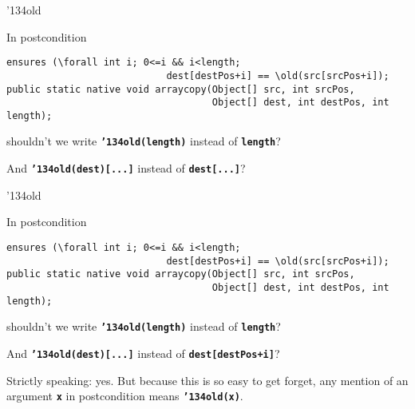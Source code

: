 \documentclass[
pdf,
nocolorBG,
slideColor,
cok,
]{prosper}
\newcommand{\code}[1]{{\rm \texttt{\textbf{\small #1}}}}
\newcommand{\bsl}{\char'134}
\newcommand{\old}{\bsl old}
\begin{document}

\begin{slide}{\old}
\vspace*{-6ex}

In postcondition 
{\tiny
\begin{verbatim} 
ensures (\forall int i; 0<=i && i<length; 
                            dest[destPos+i] == \old(src[srcPos+i]);
public static native void arraycopy(Object[] src, int srcPos,
                                    Object[] dest, int destPos, int length);
\end{verbatim}
}
shouldn't we write \code{\old(length)} instead of \code{length}?

And \code{\old(dest)[...]} instead of \code{dest[...]}?

\end{slide}


\begin{slide}{\old}
\vspace*{-6ex}

In postcondition 
{\tiny
\begin{verbatim} 
ensures (\forall int i; 0<=i && i<length; 
                            dest[destPos+i] == \old(src[srcPos+i]);
public static native void arraycopy(Object[] src, int srcPos,
                                    Object[] dest, int destPos, int length);
\end{verbatim}
}
shouldn't we write \code{\old(length)} instead of \code{length}?

And \code{\old(dest)[...]} instead of \code{dest[destPos+i]}?

\smallskip

Strictly speaking: yes. But because this is so easy to get forget,
{\blue any mention of an argument \code{x} in postcondition means \code{\old(x)}.}

\end{slide}

\end{document}
